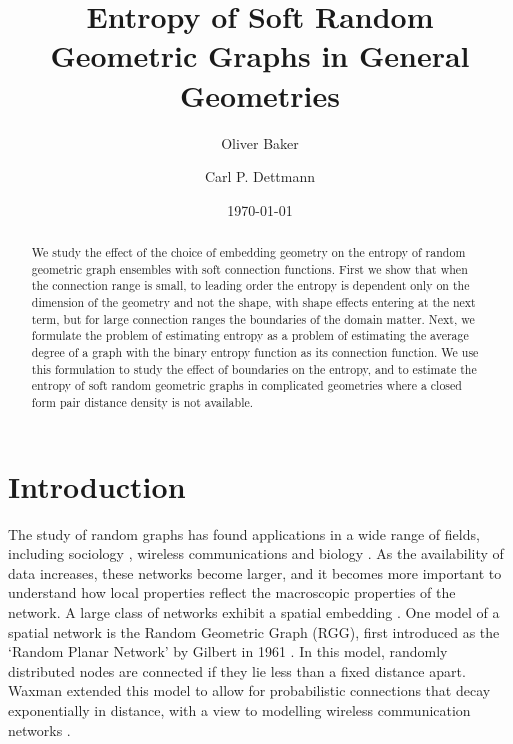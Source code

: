 \documentclass{article}
\title{Entropy of Soft Random Geometric Graphs in General Geometries}
\author[1,$\dagger$]{Oliver Baker}
\author[1]{Carl P. Dettmann}
\affil[1]{School of Mathematics, University of Bristol\footnote{Email: \{o.baker, carl.dettmann\}@bristol.ac.uk}}
\affil[$\dagger$]{Corresponding Author}
\date{\today}
\begin{document}
\maketitle

\begin{abstract}
    We study the effect of the choice of embedding geometry on the entropy of random geometric graph ensembles with soft connection functions. First we show that when the connection range is small, to leading order the entropy is dependent only on the dimension of the geometry and not the shape, with shape effects entering at the next term, but for large connection ranges the boundaries of the domain matter. Next, we formulate the problem of estimating entropy as a problem of estimating the average degree of a graph with the binary entropy function as its connection function. We use this formulation to study the effect of boundaries on the entropy, and to estimate the entropy of soft random geometric graphs in complicated geometries where a closed form pair distance density is not available.
\end{abstract}


\section{Introduction}
The study of random graphs has found applications in a wide range of fields, 
including sociology \cite{watts1998collective}, wireless communications \cite{haenggi2009stochastic} and biology \cite{van2024random}. As the availability of data increases, these networks become larger, and it becomes more important to understand how local properties reflect the macroscopic properties of the network. A large class of networks exhibit a spatial embedding \cite{barthelemy2011spatial}. One model of a spatial network is the Random Geometric Graph (RGG), first introduced as the `Random Planar Network' by Gilbert in 1961 \cite{gilbert1961random}. In this model, randomly distributed nodes are connected if they lie less than a fixed distance apart. Waxman extended this model to allow for probabilistic connections that decay exponentially in distance, with a view to modelling wireless communication networks \cite{waxman1988routing}. \\
\end{document}
